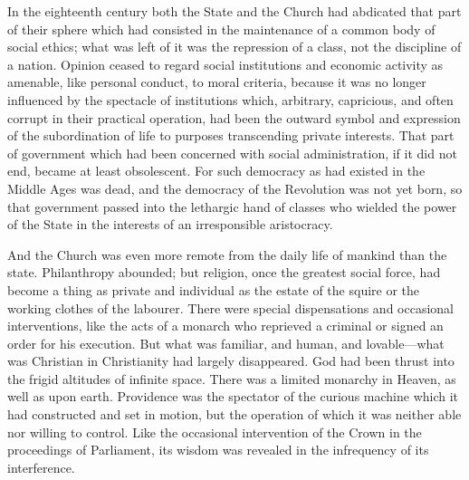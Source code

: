 \documentclass{book}
\begin{document}
In the eighteenth century both the State and the Church had abdicated that part of their sphere which had consisted in the maintenance of a common body of social ethics; what was left of it was the repression of a class, not the discipline of a nation. Opinion ceased to regard social institutions and economic activity as amenable, like personal conduct, to moral criteria, because it was no longer influenced by the spectacle of institutions which, arbitrary, capricious, and often corrupt in their practical operation, had been the outward symbol and expression of the subordination of life to purposes transcending private interests. That part of government which had been concerned with social administration, if it did not end, became at least obsolescent. For such democracy as had existed in the Middle Ages was dead, and the democracy of the Revolution was not yet born, so that government passed into the lethargic hand of classes who wielded the power of the State in the interests of an irresponsible aristocracy.

And the Church was even more remote from the daily life of mankind than the state. Philanthropy abounded; but religion, once the greatest social force, had become a thing as private and individual as the estate of the squire or the working clothes of the labourer. There were special dispensations and occasional interventions, like the acts of a monarch who reprieved a criminal or signed an order for his execution. But what was familiar, and human, and lovable—what was Christian in Christianity had largely disappeared. God had been thrust into the frigid altitudes of infinite space. There was a limited monarchy in Heaven, as well as upon earth. Providence was the spectator of the curious machine which it had constructed and set in motion, but the operation of which it was neither able nor willing to control. Like the occasional intervention of the Crown in the proceedings of Parliament, its wisdom was revealed in the infrequency of its interference.
\end{document}
